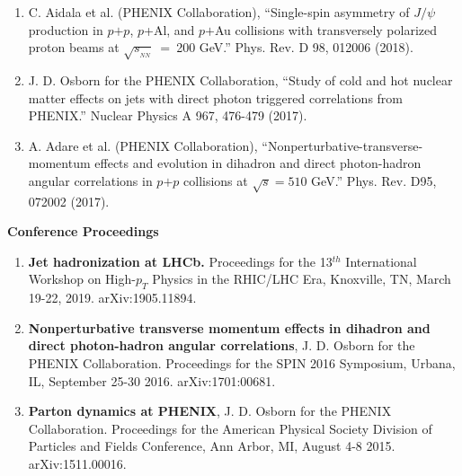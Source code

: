 \documentclass[11pt]{article}
\newcommand{\snn}{\sqrt{s_{_{NN}}}}
\begin{document}
\begin{flushleft}
\begin{center}
\begin{enumerate}
		
	\item C. Aidala et al. (PHENIX Collaboration), ``Single-spin asymmetry of $J/\psi$ production in $p$$+$$p$, $p$+Al, and $p$$+$Au collisions with transversely polarized proton beams at $\snn$~=~200 GeV.'' Phys. Rev. D 98, 012006 (2018).
	
	\item J. D. Osborn for the PHENIX Collaboration, ``Study of cold and hot nuclear matter effects on jets with direct photon triggered correlations from PHENIX.'' Nuclear Physics A 967, 476-479 (2017).
	
	\item A. Adare et al. (PHENIX Collaboration), ``Nonperturbative-transverse-momentum effects and evolution in dihadron and direct photon-hadron angular correlations in $p$$+$$p$ collisions at $\sqrt{s}=510$ GeV.''  Phys. Rev. D95, 072002 (2017).
	
\end{enumerate}
\end{center}
\end{flushleft}









\vspace{0.5cm}
\begin{flushleft}
	\Large\textbf{Conference Proceedings} \\
	\normalsize 
	\begin{enumerate}
		\item \textbf{Jet hadronization at LHCb.} Proceedings for the 13$^{th}$ International Workshop on High-$p_T$ Physics in the RHIC/LHC Era, Knoxville, TN, March 19-22, 2019. arXiv:1905.11894.
		\item \textbf{Nonperturbative transverse momentum effects in dihadron and direct photon-hadron angular correlations}, J. D. Osborn for the PHENIX Collaboration. Proceedings for the SPIN 2016 Symposium, Urbana, IL, September 25-30 2016. arXiv:1701:00681.
		\item \textbf{Parton dynamics at PHENIX}, J. D. Osborn for the PHENIX Collaboration. Proceedings for the American Physical Society Division of Particles and Fields Conference, Ann Arbor, MI, August 4-8 2015. arXiv:1511.00016. 
		
	\end{enumerate}
\end{flushleft}
\end{document}
